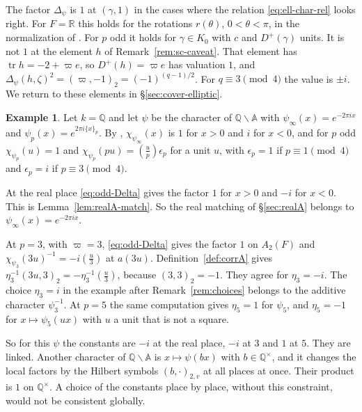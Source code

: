 \documentclass[12pt,letterpaper,openany]{book}
\theoremstyle{plain}
\theoremstyle{definition}
\newtheorem{example}[theorem]{Example}
\theoremstyle{remark}
\theoremstyle{remark}
\newcommand{\tr}{\operatorname{tr}}
\begin{document}
The factor $\Delta_\psi$ is $1$ at $(\gamma,1)$ in the cases where the
relation \eqref{eq:ell-char-rel} looks right. For $F={\mathbb R}$ this
holds for the rotations $r(\theta)$, $0<\theta<\pi$, in the
normalization of \cite[Example~7.B]{JC}. For $p$ odd it holds for
$\gamma\in K_0$ with $c$ and $D^+(\gamma)$ units. It is not $1$ at the
element $h$ of Remark~\ref{rem:sc-caveat}. That element has
$\tr h=-2+\varpi e$, so $D^+(h)=\varpi e$ has valuation $1$, and
$\Delta_\psi(h,\zeta)^2=(\varpi,-1)_2=(-1)^{(q-1)/2}$. For $q\equiv3
\pmod4$ the value is $\pm i$. We return to these elements in
\S\ref{sec:cover-elliptic}.

\begin{example}\label{ex:eta-psi}
Let $k={\mathbb Q}$ and let $\psi$ be the character of
${\mathbb Q}\backslash{\mathbb A}$ with $\psi_\infty(x)=e^{-2\pi ix}$ and
$\psi_p(x)=e^{2\pi i\{x\}_p}$. By \cite[Example~3.B]{JC},
$\chi_{\psi_\infty}(x)$ is $1$ for $x>0$ and $i$ for $x<0$, and for $p$
odd $\chi_{\psi_p}(u)=1$ and
$\chi_{\psi_p}(pu)=\left(\frac up\right)\epsilon_p$ for a unit $u$, with
$\epsilon_p=1$ if $p\equiv1\pmod4$ and $\epsilon_p=i$ if
$p\equiv3\pmod4$.

At the real place \eqref{eq:odd-Delta} gives the factor $1$ for $x>0$ and
$-i$ for $x<0$. This is Lemma~\ref{lem:realA-match}. So the real matching
of \S\ref{sec:realA} belongs to $\psi_\infty(x)=e^{-2\pi ix}$.

At $p=3$, with $\varpi=3$, \eqref{eq:odd-Delta} gives the factor $1$ on
$A_2(F)$ and $\chi_{\psi_3}(3u)^{-1}=-i\left(\frac u3\right)$ at
$a(3u)$. Definition~\ref{def:corrA} gives
$\eta_3^{-1}(3u,3)_2=-\eta_3^{-1}\left(\frac u3\right)$, because
$(3,3)_2=-1$. They agree for $\eta_3=-i$. The choice $\eta_3=i$ in the example after
Remark~\ref{rem:choices} belongs to the additive character
$\psi_3^{-1}$. At $p=5$ the same computation gives $\eta_5=1$ for
$\psi_5$, and $\eta_5=-1$ for $x\mapsto\psi_5(ux)$ with $u$ a unit that
is not a square.

So for this $\psi$ the constants are $-i$ at the real place, $-i$ at
$3$ and $1$ at $5$. They are linked. Another character of
${\mathbb Q}\backslash{\mathbb A}$ is $x\mapsto\psi(bx)$ with
$b\in{\mathbb Q}^\times$, and it changes the local factors by the Hilbert
symbols $(b,\cdot)_{2,v}$ at all places at once. Their product is $1$ on
${\mathbb Q}^\times$. A choice of the constants place by place, without
this constraint, would not be consistent globally.
\end{example}
\end{document}
